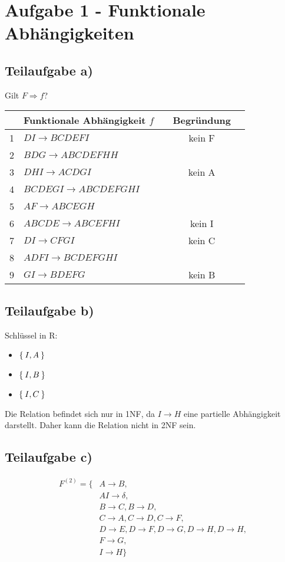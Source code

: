 \documentclass[a4paper,9pt]{scrartcl}
\newcommand{\cmark}{\ding{51}}%
\newcommand{\xmark}{\ding{55}}%
\begin{document}
\section{Aufgabe 1 - Funktionale Abhängigkeiten}
\subsection{Teilaufgabe a)}
  Gilt $F \Rightarrow f$?

  \begin{tabular}{clccl}
    & Funktionale Abhängigkeit $f$ &  & Begründung\\
    \hline\hline
    1 & $DI \rightarrow BCDEFI$         & \xmark &   kein F\\
    2 & $BDG \rightarrow ABCDEFHH$      & \cmark &\\
    3 & $DHI \rightarrow ACDGI$         & \xmark &   kein A\\
    4 & $BCDEGI \rightarrow ABCDEFGHI$  & \cmark &\\
    5 & $AF \rightarrow ABCEGH$         & \cmark &\\
    6 & $ABCDE \rightarrow ABCEFHI$     & \xmark &   kein I\\
    7 & $DI \rightarrow CFGI$           & \xmark &   kein C\\
    8 & $ADFI \rightarrow BCDEFGHI$     & \cmark &\\
    9 & $GI \rightarrow BDEFG$          & \xmark &   kein B\\
  \end{tabular}

\subsection{Teilaufgabe b)}
Schlüssel in R:
\begin{itemize}
    \item $\Set{I, A}$
    \item $\Set{I, B}$
    \item $\Set{I, C}$
\end{itemize}

Die Relation befindet sich nur in 1NF, da $I \rightarrow H$ eine 
partielle Abhängigkeit darstellt. Daher kann die Relation nicht in
2NF sein.

\subsection{Teilaufgabe c)}
\begin{align*}
F^{(2)} = \{  & A \rightarrow B,\\
    &AI \rightarrow \delta,\\
    & B \rightarrow C, B \rightarrow D,\\
    & C \rightarrow A,C \rightarrow D,C \rightarrow F,\\
    & D \rightarrow E,D \rightarrow F,D \rightarrow G,D \rightarrow H,D \rightarrow H,\\
    & F \rightarrow G,\\
    & I \rightarrow H 
\}
\end{align*}
\end{document}
